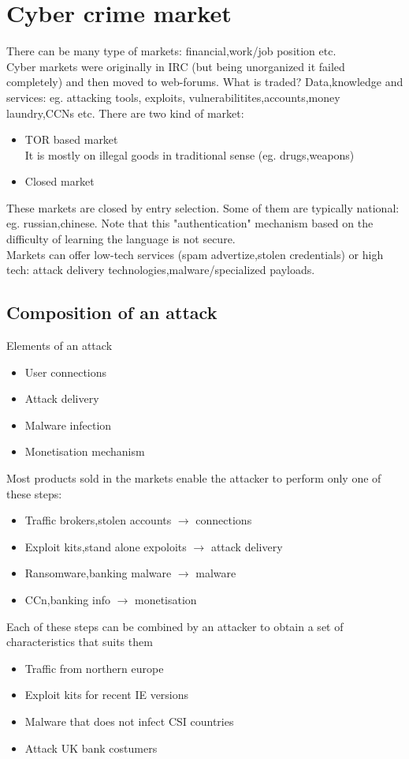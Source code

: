 \documentclass[10pt,a4paper]{book}
\begin{document}
\chapter{Cyber crime market}
There can be many type of markets: financial,work/job position etc. \\
Cyber markets were originally in IRC (but being unorganized it failed completely) and then moved to web-forums. What is traded? Data,knowledge and services: eg. attacking tools, exploits, vulnerabilitites,accounts,money laundry,CCNs etc.
There are two kind of market:
\begin{itemize}
\item TOR based market\\
It is mostly on illegal goods in traditional sense (eg. drugs,weapons)
\item Closed market
\end{itemize}
These markets are closed by entry selection. Some of them are typically national: eg. russian,chinese. Note that this "authentication" mechanism based on the difficulty of learning the language is not secure.\\
Markets can offer low-tech services (spam advertize,stolen credentials) or high tech: attack delivery technologies,malware/specialized payloads.
\section{Composition of an attack}
Elements of an attack
\begin{itemize}
\item User connections
\item Attack delivery
\item Malware infection
\item Monetisation mechanism
\end{itemize}
Most products sold in the markets enable the attacker to perform only one of these steps:
\begin{itemize}
\item Traffic brokers,stolen accounts $\to$ connections
\item Exploit kits,stand alone expoloits $\to$ attack delivery
\item Ransomware,banking malware $\to$ malware
\item CCn,banking info $\to$ monetisation
\end{itemize}
Each of these steps can be combined by an attacker to obtain a set of characteristics that suits them
\begin{itemize}
\item Traffic from northern europe
\item Exploit kits for recent IE versions
\item Malware that does not infect CSI countries
\item Attack UK bank costumers
\end{itemize}
\end{document}
